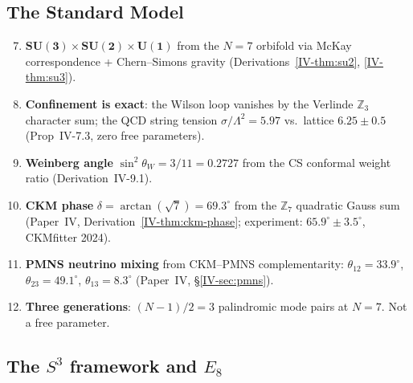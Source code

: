 \subsection{The Standard Model}

\begin{enumerate}\setcounter{enumi}{6}
\item $\mathbf{SU(3) \times SU(2) \times U(1)}$ from the
  $N = 7$ orbifold via McKay correspondence + Chern--Simons
  gravity (Derivations~\ref*{IV-thm:su2}, \ref*{IV-thm:su3}).

\item \textbf{Confinement is exact}: the Wilson loop vanishes
  by the Verlinde $\mathbb{Z}_3$ character sum; the QCD string
  tension $\sigma/\Lambda^2 = 5.97$ vs.\ lattice $6.25 \pm 0.5$
  (Prop~IV-7.3, zero free parameters).

\item \textbf{Weinberg angle} $\sin^2\theta_W = 3/11 = 0.2727$
  from the CS conformal weight ratio (Derivation~IV-9.1).

\item \textbf{CKM phase} $\delta = \arctan(\sqrt{7}) = 69.3^\circ$
  from the $\mathbb{Z}_7$ quadratic Gauss sum
  (Paper~IV, Derivation~\ref*{IV-thm:ckm-phase};
  experiment: $65.9^\circ \pm 3.5^\circ$, CKMfitter 2024).
\item \textbf{PMNS neutrino mixing} from CKM--PMNS complementarity:
  $\theta_{12} = 33.9^\circ$, $\theta_{23} = 49.1^\circ$,
  $\theta_{13} = 8.3^\circ$ (Paper~IV, \S\ref*{IV-sec:pmns}).

\item \textbf{Three generations}: $(N-1)/2 = 3$ palindromic
  mode pairs at $N = 7$.  Not a free parameter.
\end{enumerate}

\subsection{The $S^3$ framework and $E_8$}

